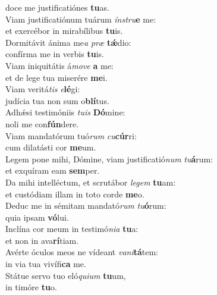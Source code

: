 \evenverse doce me justificatiónes \textbf{tu}as.\\
\oddverse Viam justificatiónum tuárum \textit{ín}\textit{stru}\textbf{e} me:~\*\\
\oddverse et exercébor in mirabílibus \textbf{tu}is.\\
\evenverse Dormitávit ánima me\textit{a} \textit{præ} \textbf{tǽ}dio:~\*\\
\evenverse confírma me in verbis \textbf{tu}is.\\
\oddverse Viam iniquitátis á\textit{mo}\textit{ve} \textbf{a} me:~\*\\
\oddverse et de lege tua miserére \textbf{me}i.\\
\evenverse Viam veritá\textit{tis} \textit{e}\textbf{lé}gi:~\*\\
\evenverse judícia tua non sum o\textbf{blí}tus.\\
\oddverse Adhǽsi testimóniis \textit{tu}\textit{is} \textbf{Dó}mine:~\*\\
\oddverse noli me con\textbf{fún}dere.\\
\evenverse Viam mandatórum tuó\textit{rum} \textit{cu}\textbf{cúr}ri:~\*\\
\evenverse cum dilatásti cor \textbf{me}um.\\
\oddverse Legem pone mihi, Dómine, viam justificatió\textit{num} \textit{tu}\textbf{á}rum:~\*\\
\oddverse et exquíram eam \textbf{sem}per.\\
\evenverse Da mihi intelléctum, et scrutábor \textit{le}\textit{gem} \textbf{tu}am:~\*\\
\evenverse et custódiam illam in toto corde \textbf{me}o.\\
\oddverse Deduc me in sémitam mandató\textit{rum} \textit{tu}\textbf{ó}rum:~\*\\
\oddverse quia ipsam \textbf{vó}lui.\\
\evenverse Inclína cor meum in testimó\textit{ni}\textit{a} \textbf{tu}a:~\*\\
\evenverse et non in ava\textbf{rí}tiam.\\
\oddverse Avérte óculos meos ne vídeant \textit{va}\textit{ni}\textbf{tá}tem:~\*\\
\oddverse in via tua vivífi\textbf{ca} me.\\
\evenverse Státue servo tuo eló\textit{qui}\textit{um} \textbf{tu}um,~\*\\
\evenverse in timóre \textbf{tu}o.\\
